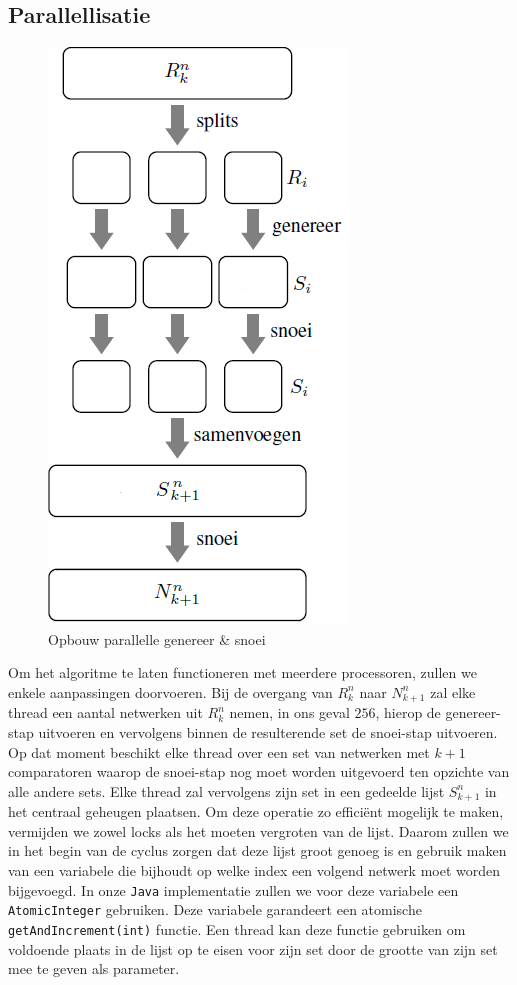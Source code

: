 \documentclass{article}
\begin{document}
\subsection{Parallellisatie}\label{Parallellisatie}
\begin{figure}
	\centering
	\includegraphics[scale=0.5]{Gen_Prune_Opbouw.png}
	\caption{Opbouw parallelle genereer \& snoei}
	\label{opbouwGenPrune}
\end{figure}
Om het algoritme te laten functioneren met meerdere processoren, zullen we enkele aanpassingen doorvoeren.
Bij de overgang van $R^n_k$ naar $N^n_{k+1}$ zal elke thread een aantal netwerken uit $R^n_k$ nemen, in ons geval $256$, hierop de genereer-stap uitvoeren en vervolgens binnen de resulterende set de snoei-stap uitvoeren.
Op dat moment beschikt elke thread over een set van netwerken met $k+1$ comparatoren waarop de snoei-stap nog moet worden uitgevoerd ten opzichte van alle andere sets.
Elke thread zal vervolgens zijn set in een gedeelde lijst $S^n_{k+1}$ in het centraal geheugen plaatsen.
Om deze operatie zo effici\"ent mogelijk te maken, vermijden we zowel locks als het moeten vergroten van de lijst. 
Daarom zullen we in het begin van de cyclus zorgen dat deze lijst groot genoeg is en gebruik maken van een variabele die bijhoudt op welke index een volgend netwerk moet worden bijgevoegd.
In onze \texttt{Java} implementatie zullen we voor deze variabele een \texttt{AtomicInteger} gebruiken.
Deze variabele garandeert een atomische \texttt{getAndIncrement(int)} functie.
Een thread kan deze functie gebruiken om voldoende plaats in de lijst op te eisen voor zijn set door de grootte van zijn set mee te geven als parameter.
\end{document}
